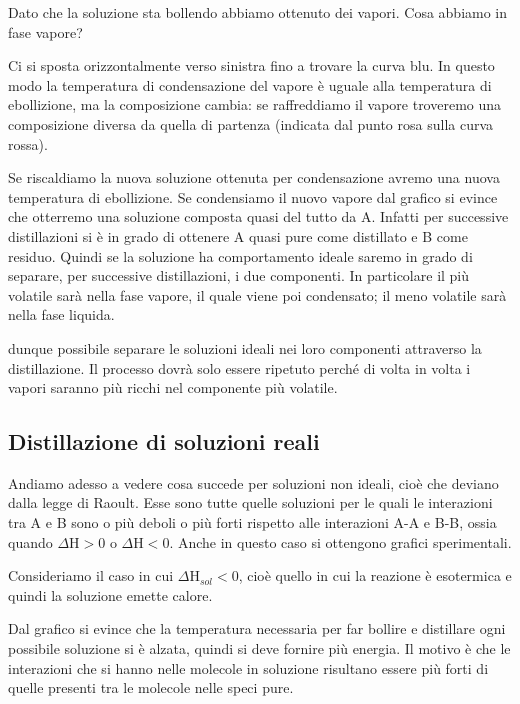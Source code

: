 Dato che la soluzione sta bollendo abbiamo ottenuto dei vapori. Cosa abbiamo in fase vapore?

Ci si sposta orizzontalmente verso sinistra fino a trovare la curva blu. In questo modo la temperatura di condensazione del vapore è uguale alla temperatura di ebollizione, ma la composizione cambia: se raffreddiamo il vapore troveremo una composizione diversa da quella di partenza (indicata dal punto rosa sulla curva rossa).

Se riscaldiamo la nuova soluzione ottenuta per condensazione avremo una nuova temperatura di ebollizione. Se condensiamo il nuovo vapore dal grafico si evince che otterremo una soluzione composta quasi del tutto da A. Infatti per successive distillazioni si è in grado di ottenere A quasi pure come distillato e B come residuo. Quindi se la soluzione ha comportamento ideale saremo in grado di separare, per successive distillazioni, i due componenti. In particolare il più volatile sarà nella fase vapore, il quale viene poi condensato; il meno volatile sarà nella fase liquida.

\E dunque possibile separare le soluzioni ideali nei loro componenti attraverso la distillazione. Il processo dovrà solo essere ripetuto perché di volta in volta i vapori saranno più ricchi nel componente più volatile.
\subsection{Distillazione di soluzioni reali}
Andiamo adesso a vedere cosa succede per soluzioni non ideali, cioè che deviano dalla legge di Raoult. Esse sono tutte quelle soluzioni per le quali le interazioni tra A e B sono o più deboli o più forti rispetto alle interazioni A-A e B-B, ossia quando $\Delta$H$>$0 o $\Delta$H$<$0. Anche in questo caso si ottengono grafici sperimentali.

\vspace{0.2cm}Consideriamo il caso in cui $\Delta$H$_{sol}<$0, cioè quello in cui la reazione è esotermica e quindi la soluzione emette calore.

Dal grafico si evince che la temperatura necessaria per far bollire e distillare ogni possibile soluzione si è alzata, quindi si deve fornire più energia. Il motivo è che le interazioni che si hanno nelle molecole in soluzione risultano essere più forti di quelle presenti tra le molecole nelle speci pure.


